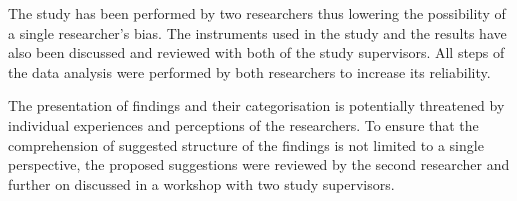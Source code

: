 The study has been performed by two researchers thus lowering the possibility of a single researcher's bias. The instruments used in the study and the results have also been discussed and reviewed with both of the study supervisors. All steps of the data analysis were performed by both researchers to increase its reliability.

The presentation of findings and their categorisation is potentially threatened by individual experiences and perceptions of the researchers. To ensure that the comprehension of suggested structure of the findings is not limited to a single perspective, the proposed suggestions were reviewed by the second researcher and further on discussed in a workshop with two study supervisors.